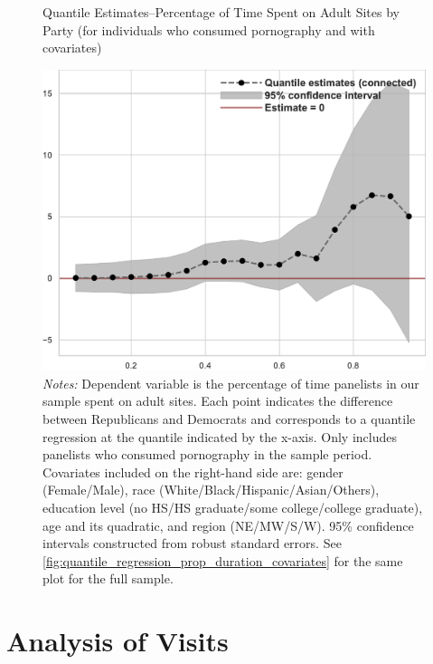 \documentclass[12pt, letterpaper]{article}
\begin{document}
\begin{figure}[ht]
	\centering
	\caption{Quantile Estimates--Percentage of Time Spent on Adult Sites by Party (for individuals who consumed pornography and with covariates)}
	\includegraphics[width=.55\linewidth]{../figs/quantile_reg_nonzero_covariates_proportion_duration_adult.pdf}
	\caption*{\footnotesize \emph{Notes:} 
		Dependent variable is the percentage of time panelists in our sample spent on adult sites.
		Each point indicates the difference between Republicans and Democrats and corresponds to a quantile regression at the quantile indicated by the x-axis.
		Only includes panelists who consumed pornography in the sample period.
		Covariates included on the right-hand side are: gender (Female/Male), race (White/Black/Hispanic/Asian/Others), education level (no HS/HS graduate/some college/college graduate), age and its quadratic, and region (NE/MW/S/W).
		95\% confidence intervals constructed from robust standard errors.
		See \cref{fig:quantile_regression_prop_duration_covariates} for the same plot for the full sample.
	}
	\label{fig:quantile_regression_prop_duration_nonzeroes_covariates}
\end{figure}
\FloatBarrier
\section{Analysis of Visits}
\end{document}
